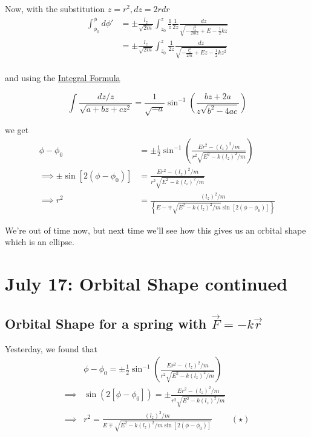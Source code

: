 \documentclass[11pt]{article}
\begin{document}
Now, with the substitution $z = r^2, dz = 2r dr$ 
\begin{align*}
  \int_{\phi_{0}}^{\phi} d\phi' &= \pm \frac{l_z}{\sqrt{2m}} \int_{z_0}^{z} \frac{1}{z} \frac{1}{2z} \frac{dz}{\sqrt{-\frac{l_z^2}{2mz} + E - \frac{1}{2}kz }} \\
  &= \pm \frac{l_z}{\sqrt{2m}} \int_{z_0}^{z} \frac{1}{2z} \frac{dz}{\sqrt{-\frac{l_z^2}{2m} + Ez - \frac{1}{2}kz^2 }} \\
\end{align*}

and using the \underline{Integral Formula}

\[ \int \frac{dz/z}{\sqrt{a + bz + cz^2}} = \frac{1}{\sqrt{-a}} \sin^{-1} \left( \frac{bz + 2a}{z \sqrt{b^2 - 4ac}} \right) \]

we get
\begin{align*}
  \phi - \phi_0 &= \pm \frac{1}{2} \sin^{-1} \left( \frac{Er^2 - (l_z)^2 / m}{r^2 \sqrt{E^2 - k(l_z)^2 / m}} \right) \\
  \implies \pm \sin\left[ 2(\phi - \phi_0) \right] &= \frac{Er^2 - (l_z)^2/m}{r^2 \sqrt{E^2 - k(l_z)^2/m}} \\
  \implies r^2 &= \frac{(l_z)^2 / m}{\left\{ E - \mp \sqrt{E^2 - k(l_z)^2/m} \sin \left[2(\phi - \phi_0)\right] \right\} }
\end{align*}

We're out of time now, but next  time we'll see how this gives us an orbital shape which is an ellipse.


\pagebreak
\section{July 17: Orbital Shape continued}

\subsection{Orbital Shape for a spring with $\vec{F} = -k\vec{r}$}

Yesterday, we found that 
\begin{align*}
  &\phi - \phi_0 = \pm \frac{1}{2} \sin^{-1}\left(\frac{Er^2 - (l_z)^2/m}{r^2 \sqrt{E^2 - k(l_z)^2/m}}\right) \\
  \implies& \sin(2[\phi - \phi_0]) = \pm  \frac{Er^2 - (l_z)^2/m}{r^2 \sqrt{E^2 - k(l_z)^2/m}} \\
  \implies&\boxed{ r^2 = \frac{(l_z)^2/m}{E \mp \sqrt{E^2 - k(l_z)^2/m \sin\left[2(\phi - \phi_0)\right] }}} \;\;\;\;\;\;\;\;(\star)
\end{align*}
\end{document}
